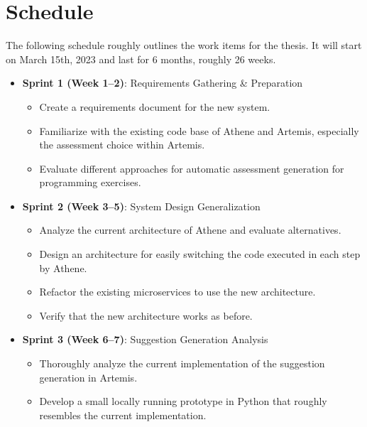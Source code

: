 \section*{Schedule}

The following schedule roughly outlines the work items for the thesis. It will start on March 15th, 2023 and last for 6 months, roughly 26 weeks.

\begin{itemize}
    \item \textbf{Sprint 1 (Week 1--2)}: Requirements Gathering \& Preparation
    \begin{itemize}
        \item Create a requirements document for the new system.
        \item Familiarize with the existing code base of Athene and Artemis, especially the assessment choice within Artemis.
        \item Evaluate different approaches for automatic assessment generation for programming exercises.
    \end{itemize}
    \item \textbf{Sprint 2 (Week 3--5)}: System Design Generalization
    \begin{itemize}
        \item Analyze the current architecture of Athene and evaluate alternatives.
        \item Design an architecture for easily switching the code executed in each step by Athene.
        \item Refactor the existing microservices to use the new architecture.
        \item Verify that the new architecture works as before.
    \end{itemize}
    \item \textbf{Sprint 3 (Week 6--7)}: Suggestion Generation Analysis
    \begin{itemize}
        \item Thoroughly analyze the current implementation of the suggestion generation in Artemis.
        \item Develop a small locally running prototype in Python that roughly resembles the current implementation.

\end{itemize}
\end{itemize}
